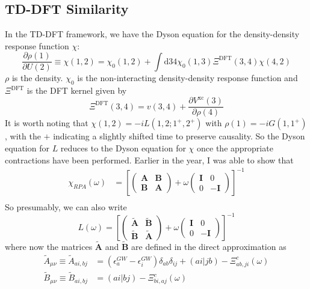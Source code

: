 \subsection{TD-DFT Similarity}
In the TD-DFT framework, we have the Dyson equation for the density-density response function $\chi$:
\begin{equation}
    \frac{\partial \rho(1)}{\partial U(2)}\equiv \chi(1,2)=\chi_0(1,2)+\int \mathrm{d} 34 \chi_0(1,3) \Xi^{\mathrm{DFT}}(3,4) \chi(4,2)
\end{equation}
$\rho$ is the density. $\chi_0$ is the non-interacting density-density response function and $\Xi^{\mathrm{DFT}}$ is the DFT kernel given by
\begin{equation}
    \Xi^{\mathrm{DFT}}(3,4)=v(3,4)+\frac{\partial V^{\mathrm{xc}}(3)}{\partial \rho(4)}
\end{equation}
It is worth noting that $\chi(1,2)=-iL(1,2;1^+, 2^+)$ with $\rho(1)=-iG(1,1^+)$, with the $+$ indicating a slightly shifted time to preserve causality. So the Dyson equation for $L$ reduces to the Dyson equation for $\chi$ once the appropriate contractions have been performed. Earlier in the year, I was able to show that
\begin{align}
\chi_{RPA}(\omega) &= \left[\left(\begin{array}{ll}
\mathbf{A} & \mathbf{B} \\
\mathbf{B} & \mathbf{A}
\end{array}\right)+\omega\left(\begin{array}{cc}
\mathbf{I} & 0 \\
0 & -\mathbf{I}
\end{array}\right)\right]^{-1} \\
\end{align}
So presumably, we can also write
\begin{equation}
    L(\omega) = \left[\left(\begin{array}{ll}\tilde{\mathbf{A}} & \tilde{\mathbf{B}} \\
\tilde{\mathbf{B}} & \tilde{\mathbf{A}}
\end{array}\right)+\omega\left(\begin{array}{cc}
\mathbf{I} & 0 \\
0 & -\mathbf{I}
\end{array}\right)\right]^{-1}
\end{equation}
where now the matrices $\tilde{\mathbf{A}}$ and $\tilde{\mathbf{B}}$ are defined in the direct approximation as
\begin{align}
\tilde{A}_{\mu \nu} \equiv \tilde{A}_{ai,bj} &= \left( \epsilon_a^{GW} - \epsilon_i^{GW} \right) \delta_{ab} \delta_{ij} + (ai|jb) - {\Xi}^c_{ab,ji}(\omega) \\
\tilde{B}_{\mu \nu} \equiv \tilde{B}_{ai,bj} &= (ai|bj) - {\Xi}^c_{bi,aj}(\omega)
\end{align}
